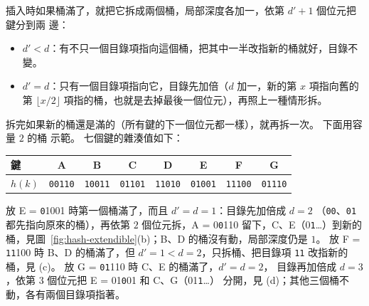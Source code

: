 插入時如果桶滿了，就把它拆成兩個桶，局部深度各加一，依第 $d' + 1$ 個位元把鍵分到兩
邊：

\begin{itemize}
\item $d' < d$：有不只一個目錄項指向這個桶，把其中一半改指新的桶就好，目錄不變。
\item $d' = d$：只有一個目錄項指向它，目錄先加倍（$d$ 加一，新的第 $x$ 項指向舊的第
$\lfloor x/2 \rfloor$ 項指的桶，也就是去掉最後一個位元），再照上一種情形拆。
\end{itemize}

拆完如果新的桶還是滿的（所有鍵的下一個位元都一樣），就再拆一次。 下面用容量 $2$ 的桶
示範。 七個鍵的雜湊值如下：

\begin{center}
\begin{tabular}{lccccccc}
\toprule
鍵 & A & B & C & D & E & F & G \\
\midrule
$h(k)$ & \texttt{00110} & \texttt{10011} & \texttt{01101} & \texttt{11010} &
\texttt{01001} & \texttt{11100} & \texttt{01110} \\
\bottomrule
\end{tabular}
\end{center}

放 E = \texttt{0}1001 時第一個桶滿了，而且 $d' = d = 1$：目錄先加倍成 $d = 2$
（\texttt{00}、\texttt{01} 都先指向原來的桶），再依第 $2$ 個位元拆，A = 0\texttt{0}110
留下，C、E（0\texttt{1}\ldots）到新的桶，見圖~\ref{fig:hash-extendible}(b)；B、D 的桶沒有動，局部深度仍是 $1$。
放 F = \texttt{11}100 時 B、D 的桶滿了，但 $d' = 1 < d = 2$，只拆桶、把目錄項
\texttt{11} 改指新的桶，見 (c)。 放 G = \texttt{01}110 時 C、E 的桶滿了，$d' = d = 2$，
目錄再加倍成 $d = 3$，依第 $3$ 個位元把 E = 01\texttt{0}01 和 C、G（01\texttt{1}\ldots）
分開，見 (d)；其他三個桶不動，各有兩個目錄項指著。


